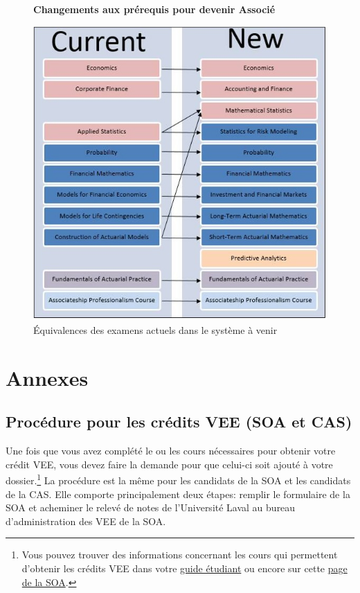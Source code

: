 \documentclass[11pt,french]{article}
\begin{document}
\begin{figure}[hp]
\begin{center}
\textbf{Changements aux prérequis pour devenir Associé}\par\medskip
\end{center}
\hfill\includegraphics{Change_ASA}\hspace*{\fill}
\caption{Équivalences des examens actuels dans le système à venir}
\end{figure}
\par

\newpage
\section*{Annexes}
\label{sec:annexes}
\subsection*{Procédure pour les crédits VEE (SOA et CAS)}
\label{subsec:vee}
Une fois que vous avez complété le ou les cours nécessaires pour obtenir votre crédit VEE, vous devez faire la demande pour que celui-ci soit ajouté à votre dossier.\footnote{Vous pouvez trouver des informations concernant les cours qui permettent d'obtenir les crédits VEE dans votre \href{https://www.act.ulaval.ca/programmes-et-cours/premier-cycle/guide-de-letudiant/}{guide étudiant} ou encore sur cette \href{https://soa.org/Education/Exam-Req/Instructions-for-VEE-Directory.aspx}{page de la SOA}.} La procédure est la même pour les candidats de la SOA et les candidats de la CAS. Elle comporte principalement deux étapes: remplir le formulaire de la SOA et acheminer le relevé de notes de l'Université Laval au bureau d'administration des VEE de la SOA.\vspace{\baselineskip} 
\end{document}
